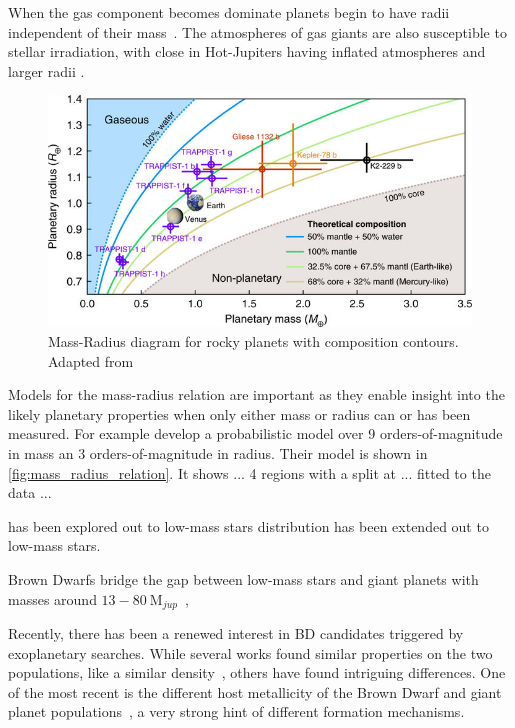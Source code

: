 When the gas component becomes dominate  planets begin to have radii independent of their mass~\citep[e.g.][]{lopez_understanding_2014}.
The atmospheres of gas giants are also susceptible to stellar irradiation, with close in Hot-Jupiters having inflated atmospheres and larger radii \citep[e.g][]{fortney_interior_2010}. 

\begin{figure}
    \centering
    \includegraphics[width=0.7\linewidth]{figures/introduction/santerne_2018}
    \caption{Mass-Radius diagram for rocky planets with composition contours. Adapted from \citet{santerne_earthsized_2018}}
    \label{fig:santerne2018}
\end{figure}



Models for the mass-radius relation are important as they enable insight into the likely planetary properties when only either mass or radius can or has been measured.
For example \citet{chen_probabilistic_2016} develop a probabilistic model over 9 orders-of-magnitude in mass an 3 orders-of-magnitude in radius.
Their model is shown in \cref{fig:mass_radius_relation}.
It shows ... 4 regions with a split at ... fitted to the data ...

 has been explored out to low-mass stars distribution has been extended out to low-mass stars. 



Brown Dwarfs bridge the gap between low-mass stars and giant planets with masses around \(13-80~\textrm{M}_{jup} \)~\citep{chabrier_theory_2000}, 



Recently, there has been a renewed interest in BD candidates triggered by exoplanetary searches.
While several works found similar properties on the two populations, like a similar density~\citep{hatzes_definition_2015}, others have found intriguing differences.
One of the most recent is the different host metallicity of the Brown Dwarf and giant planet populations~\citep{santos_observational_2017, schlaufman_evidence_2018}, a very strong hint of different formation mechanisms.



